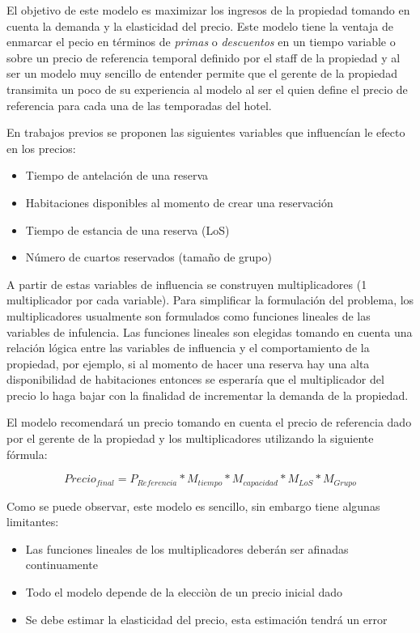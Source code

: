 {El objetivo de este modelo es maximizar los ingresos de la propiedad tomando en cuenta la demanda y la elasticidad del precio. Este modelo tiene la ventaja de enmarcar el pecio en términos de \emph{primas} o \emph{descuentos} en un tiempo variable o sobre un precio de referencia temporal definido por el staff de la propiedad y al ser un modelo muy sencillo de entender permite que el gerente de la propiedad transimita un poco de su experiencia al modelo al ser el quien define el precio de referencia para cada una de las temporadas del hotel.

En trabajos previos se proponen las siguientes variables que influencían le efecto en los precios:
\begin{itemize}
  \item Tiempo de antelación de una reserva
  \item Habitaciones disponibles al momento de crear una reservación
  \item Tiempo de estancia de una reserva (LoS)
  \item Número de cuartos reservados (tamaño de grupo)
\end{itemize}

A partir de estas variables de influencia se construyen multiplicadores (1 multiplicador por cada variable). Para simplificar la formulación del problema, los multiplicadores usualmente son formulados como funciones lineales de las variables de infulencia. Las funciones lineales son elegidas tomando en cuenta una relación lógica entre las variables de influencia y el comportamiento de la propiedad, por ejemplo, si al momento de hacer una reserva hay una alta disponibilidad de habitaciones entonces se esperaría que el multiplicador del precio lo haga bajar con la finalidad de incrementar la demanda de la propiedad.

El modelo recomendará un precio tomando en cuenta el precio de referencia dado por el gerente de la propiedad y los multiplicadores utilizando la siguiente fórmula:

$$Precio_{final} = P_{Referencia} * M_{tiempo} * M_{capacidad} * M_{LoS} * M_{Grupo}$$

Como se puede observar, este modelo es sencillo, sin embargo tiene algunas limitantes:
\begin{itemize}
  \item Las funciones lineales de los multiplicadores deberán ser afinadas continuamente
  \item Todo el modelo depende de la elecciòn de un precio inicial dado
  \item Se debe estimar la elasticidad del precio, esta estimación tendrá un error
\end{itemize}

}
